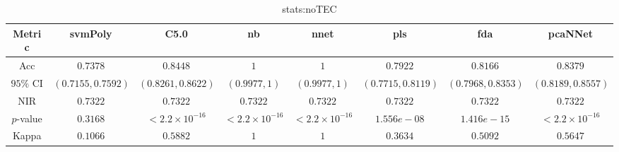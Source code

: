 \begin{table}[!ht]
	\centering
	\begin{tabular}{|c|c|c|c|c|c|c|c|}
		\hline
		Metric & svmPoly & C5.0 & nb & nnet & pls & fda & pcaNNet \\ \hline
		Acc & $0.7378$ & $0.8448$ & $1$ & $1$ & $0.7922$ & $0.8166$ & $0.8379$ \\ \hline
		$95\%$ CI & $(0.7155, 0.7592)$ & $(0.8261, 0.8622)$ & $(0.9977, 1)$ & $(0.9977, 1)$ & $(0.7715, 0.8119)$ & $(0.7968, 0.8353)$ & $(0.8189, 0.8557)$ \\ \hline
		NIR & $0.7322$ & $0.7322$ & $0.7322$ & $0.7322$ & $0.7322$ & $0.7322$ & $0.7322$ \\ \hline
		$p$-value & $0.3168$ & $< 2.2 \times {10}^{-16}$ & $< 2.2 \times {10}^{-16}$ & $< 2.2 \times {10}^{-16}$ & $1.556e-08$ & $1.416e-15$ & $< 2.2 \times {10}^{-16}$ \\ \hline
		Kappa & $0.1066$ & $0.5882$ & $1$ & $1$ & $0.3634$ & $0.5092$ & $0.5647$ \\ \hline
	\end{tabular}
	\caption{stats:noTEC}
	\label{tab:stats:noTEC}
\end{table}
